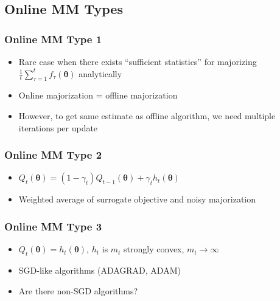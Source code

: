 \documentclass{beamer}
\begin{document}
\subsection{Online MM Types}
\begin{frame}
  \frametitle{Online MM Type 1}
  \begin{itemize}
    \item Rare case when there exists ``sufficient statistics'' for majorizing $\frac{1}{t}\sum_{\tau=1}^t f_\tau(\bm\theta)$ analytically
    \item Online majorization = offline majorization
    \item However, to get same estimate as offline algorithm, we need multiple iterations per update
  \end{itemize}
\end{frame}
\begin{frame}
  \frametitle{Online MM Type 2}
  \begin{itemize}
    \item $Q_t(\bm\theta) = (1 - \gamma_t)Q_{t-1}(\bm\theta) + \gamma_t h_t(\bm\theta)$
    \item Weighted average of surrogate objective and noisy majorization
  \end{itemize}
\end{frame}
\begin{frame}
  \frametitle{Online MM Type 3}
  \begin{itemize}
    \item $Q_t(\bm\theta) = h_t(\bm\theta)$, $h_t$ is $m_t$ strongly convex, $m_t\rightarrow\infty$
    \item SGD-like algorithms (ADAGRAD, ADAM)
    \item Are there non-SGD algorithms?
  \end{itemize}
\end{frame}
\end{document}
